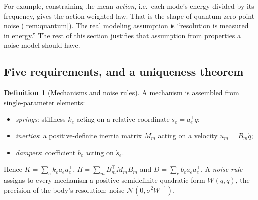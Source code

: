 \documentclass[11pt]{article}
\theoremstyle{definition}
\newtheorem{definition}[theorem]{Definition}
\theoremstyle{remark}
\begin{document}
For example, constraining the mean \emph{action}, i.e.\ each mode's energy divided by its
frequency, gives the action-weighted law. That is the shape of quantum zero-point noise
(\cref{rem:quantum}). The real modeling assumption is ``resolution is measured in
energy.'' The rest of this section justifies that assumption from properties a noise model
should have.

\subsection{Five requirements, and a uniqueness theorem}

\begin{definition}[Mechanisms and noise rules]\label{def:rule}
A mechanism is assembled from single-parameter elements:
\begin{itemize}[nosep]
  \item \emph{springs}: stiffness $k_e$ acting on a relative coordinate $s_e=a_e^\top q$;
  \item \emph{inertias}: a positive-definite inertia matrix $M_m$ acting on a velocity
        $u_m=B_m\dot q$;
  \item \emph{dampers}: coefficient $b_e$ acting on $\dot s_e$.
\end{itemize}
Hence $K=\sum_ek_ea_ea_e^\top$, $H=\sum_mB_m^\top M_mB_m$ and $D=\sum_eb_ea_ea_e^\top$.
A \emph{noise rule} assigns to every mechanism a positive-semidefinite quadratic form
$W(q,\dot q)$, the precision of the body's resolution: noise $\mathcal N(0,\sigma^2W^{-1})$.
\end{definition}
\end{document}
